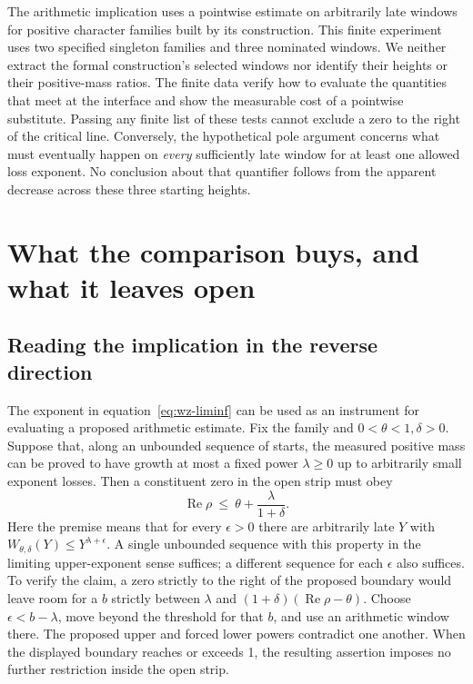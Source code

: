 \documentclass[12pt,letterpaper]{article}
\begin{document}
The arithmetic implication uses a pointwise estimate on arbitrarily late windows for positive character families built by its construction. This finite experiment uses two specified singleton families and three nominated windows. We neither extract the formal construction's selected windows nor identify their heights or their positive-mass ratios. The finite data verify how to evaluate the quantities that meet at the interface and show the measurable cost of a pointwise substitute. Passing any finite list of these tests cannot exclude a zero to the right of the critical line. Conversely, the hypothetical pole argument concerns what must eventually happen on \emph{every} sufficiently late window for at least one allowed loss exponent. No conclusion about that quantifier follows from the apparent decrease across these three starting heights.


\section{What the comparison buys, and what it leaves open}
\subsection{Reading the implication in the reverse direction}
The exponent in equation~\eqref{eq:wz-liminf} can be used as an instrument for evaluating a proposed arithmetic estimate. Fix the family and \(0<\theta<1,\delta>0\). Suppose that, along an unbounded sequence of starts, the measured positive mass can be proved to have growth at most a fixed power \(\lambda\ge0\) up to arbitrarily small exponent losses. Then a constituent zero in the open strip must obey
\begin{equation}
              \operatorname{Re}\rho\ \le\ \theta+\frac{\lambda}{1+\delta}.
              \label{eq:inverse-budget}
\end{equation}
Here the premise means that for every \(\epsilon>0\) there are arbitrarily late \(Y\) with \(W_{\theta,\delta}(Y)\le Y^{\lambda+\epsilon}\). A single unbounded sequence with this property in the limiting upper-exponent sense suffices; a different sequence for each \(\epsilon\) also suffices. To verify the claim, a zero strictly to the right of the proposed boundary would leave room for a \(b\) strictly between \(\lambda\) and \((1+\delta)(\operatorname{Re}\rho-\theta)\). Choose \(\epsilon<b-\lambda\), move beyond the threshold for that \(b\), and use an arithmetic window there. The proposed upper and forced lower powers contradict one another. When the displayed boundary reaches or exceeds 1, the resulting assertion imposes no further restriction inside the open strip.
\end{document}
